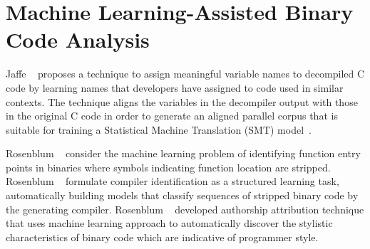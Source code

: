 \section{Machine Learning-Assisted Binary Code Analysis}

Jaffe \etal~\cite{Jaffe:2018ICPC} proposes a technique to assign meaningful
variable names to decompiled C code by learning names that developers have
assigned to code used in similar contexts. The technique aligns the variables
in the decompiler output with those in the original C code in order to generate
an aligned parallel corpus that is suitable for training a Statistical Machine
Translation (SMT) model~\cite{Koehn:2007}.  

Rosenblum \etal~\cite{Rosenblum2007,Rosenblum:2008,Bao:2014,Shin:2015} consider
the machine learning problem of identifying function entry points in binaries
where symbols indicating function location are stripped.
%
Rosenblum \etal~\cite{Rosenblum:2010} formulate compiler identification as a
structured learning task, automatically building models that classify sequences
of stripped binary code by the generating compiler.
%
Rosenblum \etal~\cite{Rosenblum:2011} developed authorship attribution
technique that uses machine learning approach to automatically discover the
stylistic characteristics of binary code which are indicative of programmer
style.
